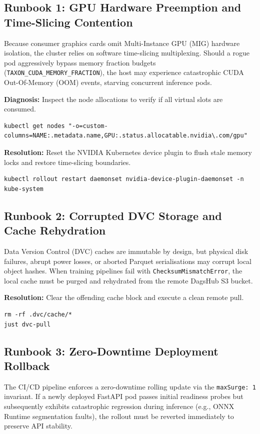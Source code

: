 \subsection{Runbook 1: GPU Hardware Preemption and Time-Slicing Contention}
Because consumer graphics cards omit Multi-Instance GPU (MIG) hardware isolation, the cluster relies on software time-slicing multiplexing. Should a rogue pod aggressively bypass memory fraction budgets (\texttt{TAXON\_CUDA\_MEMORY\_FRACTION}), the host may experience catastrophic CUDA Out-Of-Memory (OOM) events, starving concurrent inference pods.

\textbf{Diagnosis:} Inspect the node allocations to verify if all virtual slots are consumed.
\begin{verbatim}
kubectl get nodes "-o=custom-columns=NAME:.metadata.name,GPU:.status.allocatable.nvidia\.com/gpu"
\end{verbatim}

\textbf{Resolution:} Reset the NVIDIA Kubernetes device plugin to flush stale memory locks and restore time-slicing boundaries.
\begin{verbatim}
kubectl rollout restart daemonset nvidia-device-plugin-daemonset -n kube-system
\end{verbatim}

\subsection{Runbook 2: Corrupted DVC Storage and Cache Rehydration}
Data Version Control (DVC) caches are immutable by design, but physical disk failures, abrupt power losses, or aborted Parquet serialisations may corrupt local object hashes. When training pipelines fail with \texttt{ChecksumMismatchError}, the local cache must be purged and rehydrated from the remote DagsHub S3 bucket.

\textbf{Resolution:} Clear the offending cache block and execute a clean remote pull.
\begin{verbatim}
rm -rf .dvc/cache/*
just dvc-pull
\end{verbatim}

\subsection{Runbook 3: Zero-Downtime Deployment Rollback}
The CI/CD pipeline enforces a zero-downtime rolling update via the \texttt{maxSurge: 1} invariant. If a newly deployed FastAPI pod passes initial readiness probes but subsequently exhibits catastrophic regression during inference (e.g., ONNX Runtime segmentation faults), the rollout must be reverted immediately to preserve API stability.

